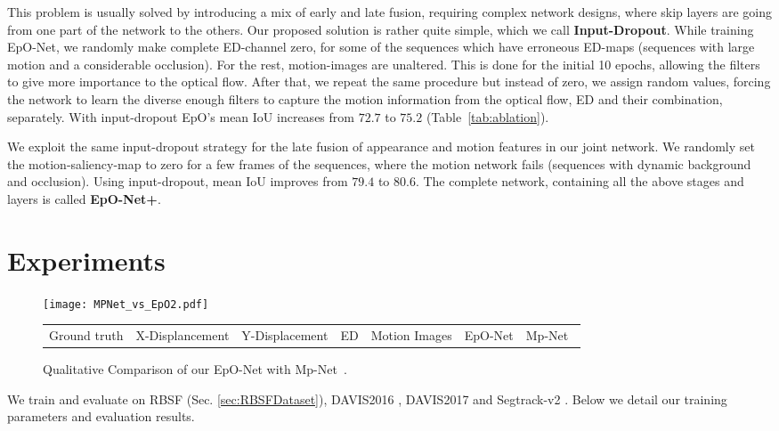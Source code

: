 \documentclass[10pt,twocolumn,letterpaper]{article}
\newcommand{\rowSpace}{\vspace{-0.4cm}}
\begin{document}
This problem is usually solved by introducing a mix of early and late fusion, requiring complex network designs, where skip layers are going from one part of the network to the others. Our proposed solution is rather quite simple, which we call \textbf{Input-Dropout}. 
While training EpO-Net, we randomly make complete ED-channel zero, for some of the sequences which have erroneous ED-maps (sequences with large motion and a considerable occlusion). For the rest, motion-images are unaltered. This is done for the initial 10 epochs, allowing the filters to give more importance to the optical flow. After that, we repeat the same procedure but instead of zero, we assign random values, forcing the network to learn the diverse enough filters to capture the motion information from the optical flow, ED and their combination, separately. With input-dropout EpO's mean IoU increases from $72.7$ to $75.2$ (Table~\ref{tab:ablation}).

We exploit the same input-dropout strategy for the late fusion of appearance and motion features in our joint network. 
We randomly set the motion-saliency-map to zero for a few frames of the sequences, where the motion network fails (sequences with dynamic background and occlusion). Using input-dropout, mean IoU improves from $79.4$ to $80.6$.
The complete network, containing all the above stages and layers is called \textbf{EpO-Net+}.
\vspace{-0.20cm} 
\section{Experiments}

\setlength{\tabcolsep}{0.5pt}
\begin{figure*}[!th]    
\center
\texttt{[image: MPNet\_vs\_EpO2.pdf]}

\begin{tabular}{P{1.0in}P{0.9in}P{1.0in}P{0.95in}P{0.95in}P{0.95in}P{1.0in}}

\small{Ground truth} & \small{X-Displancement} & \small{Y-Displacement} & \small{ED}  & \small{Motion Images} & \small{EpO-Net} & \small{Mp-Net~\cite{MpNet}} 
\end{tabular}
\rowSpace
\caption{Qualitative Comparison of our EpO-Net with Mp-Net~\cite{MpNet}.}
\label{fig:OurvsMpNet}
\rowSpace
\end{figure*}

We train and evaluate on RBSF (Sec. \ref{sec:RBSFDataset}), DAVIS2016 \cite{DAVIS2016}, DAVIS2017 \cite{DAVIS2017} and Segtrack-v2  \cite{segtrackv2}. 
Below we detail our training parameters and evaluation results. 
\end{document}
